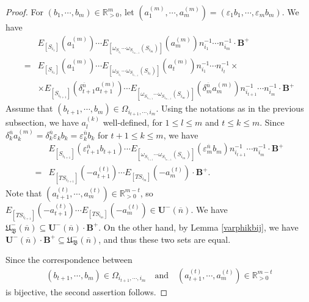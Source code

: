 \documentclass[12pt]{amsart}
\begin{document}
\begin{proof}
    For $(b_1,\cdots,b_m)\in \mathbb{R}_{>0}^m$, let $(a_1^{(m)},\cdots,a_m^{(m)})=(\varepsilon_1b_1,\cdots,\varepsilon_mb_m)$.
We have 
\begin{align*}
    & E_{[S_{i_1}]}(a_1^{(m)})\cdots E_{[\omega_{S_{i_1}}\cdots\omega_{S_{i_{m-1}}}(S_{i_m})]}(a_m^{(m)})n_{i_1}^{-1}\cdots n_{i_m}^{-1}\cdot \mathbf{B}^+\\
   =& E_{[S_{i_1}]}(a_1^{(m)})\cdots E_{[\omega_{S_{i_1}}\cdots\omega_{S_{i_{t-1}}}(S_{i_t})]}(a_t^{(m)})n_{i_1}^{-1}\cdots n_{i_t}^{-1} \times \\
   & \times E_{[S_{i_{t+1}}]}(\delta_{t+1}^{\overline{n}}a_{t+1}^{(m)})\cdots E_{[\omega_{S_{i_{t+1}}}\cdots\omega_{S_{i_{m-1}}}(S_{i_m})]}(\delta_m^{\overline{n}}a_m^{(m)}) n_{i_{t+1}}^{-1}\cdots n_{i_m}^{-1}   \cdot \mathbf{B}^+
\end{align*}
Assume that $(b_{t+1},\cdots,b_m)\in \Omega_{i_{t+1},\cdots,i_m}$. 
Using the notations as in the previous subsection, we have $a_{l}^{(k)}$ well-defined, for $1\leq l\leq m$ and $t\leq k\leq m$.
Since $\delta_k^{\overline{n}}a_k^{(m)}=\delta_k^{\overline{n}}\varepsilon_kb_k=\varepsilon_k^{\overline{n}}b_k$ for $t+1\leq k \leq m$, we have 
\begin{align*}
          &E_{[S_{i_{t+1}}]}(\varepsilon_{t+1}^{\overline{n}}b_{t+1})  \cdots E_{[\omega_{S_{i_{t+1}}}\cdots\omega_{S_{i_{m-1}}}(S_{i_m})]}(\varepsilon_m^{\overline{n}}b_m)n_{i_{t+1}}^{-1}\cdots n_{i_m}^{-1} \cdot \mathbf{B}^+ \\
    =&E_{[TS_{i_{t+1}}]}(-a_{t+1}^{(t)})\cdots E_{[TS_{i_m}]}(-a_m^{(t)}) \cdot \mathbf{B}^+.
\end{align*}
Note that $(a_{t+1}^{(t)},\cdots,a_m^{(t)})\in \mathbb{R}_{>0}^{m-t}$, so $E_{[TS_{i_{t+1}}]}(-a_{t+1}^{(t)})\cdots E_{[TS_{i_m}]}(-a_m^{(t)})\in \mathbf{U}^-(\overline{n})$.
We have  $\mathfrak{U}^-_{\mathfrak{B}}(\overline{n}) \subseteq \mathbf{U}^-(\overline{n})\cdot \mathbf{B}^+$.
On the other hand, by Lemma \ref{varphikbij}, we have $\mathbf{U}^-(\overline{n})\cdot \mathbf{B}^+  \subseteq \mathfrak{U}^-_{\mathfrak{B}}(\overline{n})$, and thus these two sets are equal.

Since the correspondence between
\begin{align*}
    (b_{t+1},\cdots,b_m)\in \Omega_{i_{t+1},\cdots,i_m}\quad \text{and} \quad (a_{t+1}^{(t)},\cdots,a_m^{(t)})\in \mathbb{R}_{>0}^{m-t}
\end{align*}
 is bijective, the second assertion follows.
\end{proof}
\end{document}
